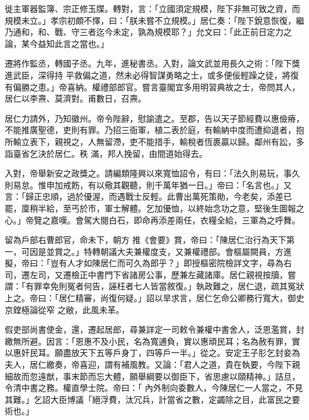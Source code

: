 \begin{pinyinscope}
 徙主軍器監簿、宗正修玉牒。轉對，言：「立國須定規模，陛下非無可致之資，而規模未立。」孝宗初頗不懌，曰：「朕未嘗不立規模。」居仁奏：「陛下銳意恢復，繼乃通和，和、戰、守三者迄今未定，孰為規模耶？」允文曰：「此正前日定力之論，某今益知此言之當也。」



 遷將作監丞，轉國子丞。九年，進秘書丞。入對，論文武並用長久之術：「陛下獎進武臣，深得持
 平救偏之道，然未必得智謀勇略之士，或多便佞輕躁之徒，將復有偏勝之患。」帝喜納。權禮部郎官。嘗言臺閣宜多用明習典故之士，帝問其人，居仁以李燾、莫濟對。甫數日，召燾。



 居仁力請外，乃知徽州。帝令陛辭，慰諭遣之。至郡，告以天子節經費以惠儉瘠，不能推廣聖德，吏則有罪。乃招三衙軍，植二表於庭，有輸納中度而遭抑退者，抱所輸立表下，親視之，人無留滯，吏不能措手，輸稅者恆裹贏以歸。鄰州有訟，多詣臺省乞決於居仁。秩
 滿，邦人挽留，由間道始得去。



 入對，帝舉新安之政獎之。請編類隆興以來寬恤詔令，有曰：「法久則易玩，事久則易怠。惟申加戒飭，有以儆其觀聽，則千萬年猶一日。」帝曰：「名言也。」又言：「歸正忠順，過於優渥，而遇戰士反輕。此曹出萬死策勛，今老矣，添差已罷，廩稍半給，至丐於市，軍士解體。乞加優恤，以終始念功之意，堅後生圖報之心。」帝覽之嘉嘆。會駕大閱白石，即命再添差兩任，衣糧全給，三軍為之呼舞。



 留為戶部右曹郎官，命未下，朝方
 推《會要》賞，帝曰：「陳居仁治行為天下第一，可因是並賞之。」特轉朝議大夫兼權度支，又兼權禮部。會樞屬闕員，方進擬，帝曰：「豈有人才如陳居仁而可久為郎乎？」即授樞密院檢詳文字，尋為右司，遷左司，又遷檢正中書門下省諸房公事，歷兼左藏諸庫。居仁親視按牘，嘗謂：「有罪幸免則冤者何告，誣枉者七人皆當敘復。」執政難之，居仁退，疏其冤狀上之。帝曰：「居仁精審，尚復何疑。」詔以旱求言，居仁乞命公卿務行寬大，御史京鏜極論從窄
 之敝，此風未革。



 假吏部尚書使金，還，遷起居郎，尋兼詳定一司敕令兼權中書舍人，泛恩濫賞，封繳無所避。因言：「恩惠不及小民，名為寬逋負，實以惠頑民耳；名為赦有罪，實以惠奸民耳。願盡放天下五等戶身丁，四等戶一半。」從之。安定王子肜乞封妾為夫人，居仁繳奏，帝喜迎，謂有補風教。又論：「君人之道，貴在執要，今陛下親細故而忽遠猷，事末節而忘大體，願舉綱要以御臣下，省思慮以頤精神。」詰旦，令清中書之務。權直學士院。帝曰：「
 內外制向委數人，今陳居仁一人當之，不見其難。」乞詔大臣博議「絕浮費，汰冗兵，計當省之數，定蠲除之目，此富民之要術也。」




\end{pinyinscope}
